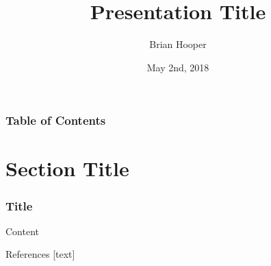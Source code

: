 \documentclass[12pt]{beamer}
\title{Presentation Title}
\author{Brian Hooper}
\date{May 2nd, 2018}
\begin{document}
	\frame{\titlepage}
	\begin{frame}
		\frametitle{Table of Contents}
		\tableofcontents[]
	\end{frame}

	\section{Section Title}
	\begin{frame}
		\frametitle{Title}
		Content \cite{knuth}
	\end{frame}

\begin{frame}[shrink=50,fragile]{References} 
[text] %
	
\end{frame}
\end{document}
